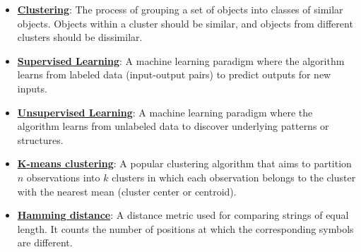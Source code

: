 \documentclass{article}%
\begin{document}
\begin{itemize}[leftmargin=*]%
\item \href{https://purdue.brightspace.com/d2l/common/assets/pdfjs-d2l-dist/1.0.14-legacy/web/viewer.html?file=%2Fcontent%2Fenforced%2F1095467-wl.202510.CS.24300.001%2F12L2-distance-clusters.pdf%3Fou%3D1095467&lang=en-us&container=d2l-fileviewer-rendered-pdf&fullscreen=d2l-fileviewer-rendered-pdf-dialog&height=667#page=4}{\textbf{Clustering}}: The process of grouping a set of objects into classes of similar objects. Objects within a cluster should be similar, and objects from different clusters should be dissimilar.%
\item \href{https://purdue.brightspace.com/d2l/common/assets/pdfjs-d2l-dist/1.0.14-legacy/web/viewer.html?file=%2Fcontent%2Fenforced%2F1095467-wl.202510.CS.24300.001%2F12L2-distance-clusters.pdf%3Fou%3D1095467&lang=en-us&container=d2l-fileviewer-rendered-pdf&fullscreen=d2l-fileviewer-rendered-pdf-dialog&height=667#page=3}{\textbf{Supervised Learning}}: A machine learning paradigm where the algorithm learns from labeled data (input-output pairs) to predict outputs for new inputs.%
\item \href{https://purdue.brightspace.com/d2l/common/assets/pdfjs-d2l-dist/1.0.14-legacy/web/viewer.html?file=%2Fcontent%2Fenforced%2F1095467-wl.202510.CS.24300.001%2F12L2-distance-clusters.pdf%3Fou%3D1095467&lang=en-us&container=d2l-fileviewer-rendered-pdf&fullscreen=d2l-fileviewer-rendered-pdf-dialog&height=667#page=3}{\textbf{Unsupervised Learning}}: A machine learning paradigm where the algorithm learns from unlabeled data to discover underlying patterns or structures.%
\item \href{https://purdue.brightspace.com/d2l/common/assets/pdfjs-d2l-dist/1.0.14-legacy/web/viewer.html?file=%2Fcontent%2Fenforced%2F1095467-wl.202510.CS.24300.001%2F12L2-distance-clusters.pdf%3Fou%3D1095467&lang=en-us&container=d2l-fileviewer-rendered-pdf&fullscreen=d2l-fileviewer-rendered-pdf-dialog&height=667#page=21}{\textbf{K{-}means clustering}}: A popular clustering algorithm that aims to partition $n$ observations into $k$ clusters in which each observation belongs to the cluster with the nearest mean (cluster center or centroid).%
\item \href{https://purdue.brightspace.com/d2l/common/assets/pdfjs-d2l-dist/1.0.14-legacy/web/viewer.html?file=%2Fcontent%2Fenforced%2F1095467-wl.202510.CS.24300.001%2F12L2-distance-clusters.pdf%3Fou%3D1095467&lang=en-us&container=d2l-fileviewer-rendered-pdf&fullscreen=d2l-fileviewer-rendered-pdf-dialog&height=667#page=19}{\textbf{Hamming distance}}: A distance metric used for comparing strings of equal length. It counts the number of positions at which the corresponding symbols are different.%

\end{itemize}
\end{document}
